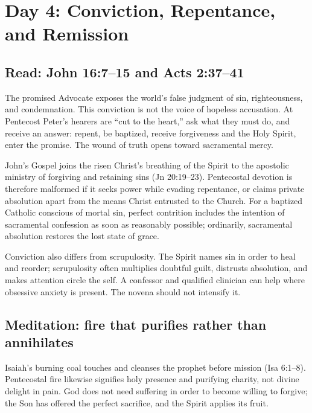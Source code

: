 \section{Day 4: Conviction, Repentance, and Remission}


\subsection{Read: John 16:7--15 and Acts 2:37--41}

The promised Advocate exposes the world's false judgment of sin, righteousness, and condemnation. This conviction is not the voice of hopeless accusation. At Pentecost Peter's hearers are “cut to the heart,” ask what they must do, and receive an answer: repent, be baptized, receive forgiveness and the Holy Spirit, enter the promise. The wound of truth opens toward sacramental mercy.

John's Gospel joins the risen Christ's breathing of the Spirit to the apostolic ministry of forgiving and retaining sins (Jn 20:19--23). Pentecostal devotion is therefore malformed if it seeks power while evading repentance, or claims private absolution apart from the means Christ entrusted to the Church. For a baptized Catholic conscious of mortal sin, perfect contrition includes the intention of sacramental confession as soon as reasonably possible; ordinarily, sacramental absolution restores the lost state of grace.

Conviction also differs from scrupulosity. The Spirit names sin in order to heal and reorder; scrupulosity often multiplies doubtful guilt, distrusts absolution, and makes attention circle the self. A confessor and qualified clinician can help where obsessive anxiety is present. The novena should not intensify it.

\subsection{Meditation: fire that purifies rather than annihilates}

Isaiah's burning coal touches and cleanses the prophet before mission (Isa 6:1--8). Pentecostal fire likewise signifies holy presence and purifying charity, not divine delight in pain. God does not need suffering in order to become willing to forgive; the Son has offered the perfect sacrifice, and the Spirit applies its fruit.

